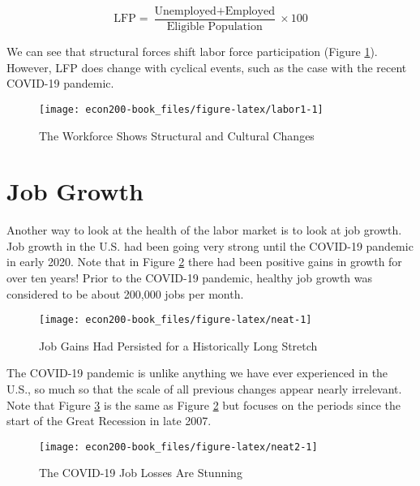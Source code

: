 \documentclass[
]{book}
\begin{document}
\[ \text{LFP} = \frac{\text{Unemployed}+\text{Employed}}{\text{Eligible Population}} \times 100 \]

We can see that structural forces shift labor force participation (Figure \ref{fig:labor1}). However, LFP does change with cyclical events, such as the case with the recent COVID-19 pandemic.

\begin{figure}

{\centering \texttt{[image: econ200-book\_files/figure-latex/labor1-1]} 

}

\caption{The Workforce Shows Structural and Cultural Changes}\label{fig:labor1}
\end{figure}

\hypertarget{job-growth}{%
\section{Job Growth}\label{job-growth}}

Another way to look at the health of the labor market is to look at job growth. Job growth in the U.S. had been going very strong until the COVID-19 pandemic in early 2020. Note that in Figure \ref{fig:neat} there had been positive gains in growth for over ten years! Prior to the COVID-19 pandemic, healthy job growth was considered to be about 200,000 jobs per month.

\begin{figure}

{\centering \texttt{[image: econ200-book\_files/figure-latex/neat-1]} 

}

\caption{Job Gains Had Persisted for a Historically Long Stretch}\label{fig:neat}
\end{figure}

The COVID-19 pandemic is unlike anything we have ever experienced in the U.S., so much so that the scale of all previous changes appear nearly irrelevant. Note that Figure \ref{fig:neat2} is the same as Figure \ref{fig:neat} but focuses on the periods since the start of the Great Recession in late 2007.

\begin{figure}

{\centering \texttt{[image: econ200-book\_files/figure-latex/neat2-1]} 

}

\caption{The COVID-19 Job Losses Are Stunning}\label{fig:neat2}
\end{figure}
\end{document}
